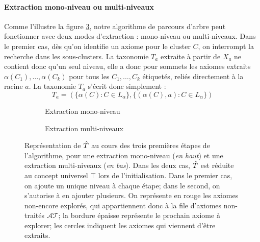 \paragraph{Extraction mono-niveau ou multi-niveaux}


Comme l'illustre la figure \ref{fig:texp-tree-expansion}, notre algorithme de parcours d'arbre peut fonctionner avec deux modes d'extraction : mono-niveau ou multi-niveaux. Dans le premier cas, dès qu'on identifie un axiome pour le cluster $C$, on interrompt la recherche dans les sous-clusters. La taxonomie $T_a$ extraite à partir de $X_a$ ne contient donc qu'un seul niveau, elle a donc pour sommets les axiomes extraits $\alpha(C_1), \ldots, \alpha(C_k)$ pour tous les $C_1, \ldots, C_k$ étiquetés, reliés directement à la racine $a$. La taxonomie $T_a$ s'écrit donc simplement :
\begin{equation}
    T_a = ( \{ \alpha(C) : C \in L_\alpha \}, \{ (\alpha(C), a) : C \in L_\alpha \} )
\end{equation}

\begin{figure}[h]
    \centering
    
    \begin{subfigure}{\textwidth}
        \centering
        
        \caption{Extraction mono-niveau}
        \label{subfig:tree-singlelevel}
    \end{subfigure}
    
    \begin{subfigure}{\textwidth}
        \centering
        
        \caption{Extraction multi-niveaux}
        \label{subfig:tree-multilevel}
    \end{subfigure}
    
    \caption[Extraction mono-niveau et extraction multi-niveaux]{Représentation de $\hat{T}$ au cours des trois premières étapes de l'algorithme, pour une extraction mono-niveau (\textit{en haut}) et une extraction multi-niveaux (\textit{en bas}). Dans les deux cas, $\hat{T}$ est réduite au concept universel $\top$ lors de l'initialisation. Dans le premier cas, on ajoute un unique niveau à chaque étape; dans le second, on s'autorise à en ajouter plusieurs. On représente en rouge les axiomes non-encore explorés, qui appartiennent donc à la file d'axiomes non-traités $\mathcal{AT}$; la bordure épaisse représente le prochain axiome à explorer; les cercles indiquent les axiomes qui viennent d'être extraits.}
    \label{fig:texp-tree-expansion}
\end{figure}


